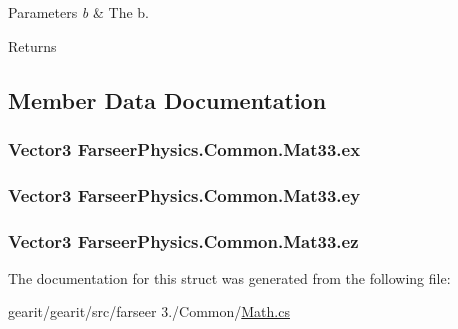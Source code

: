 \begin{DoxyParams}{Parameters}
{\em b} & The b.\\
\hline
\end{DoxyParams}
\begin{DoxyReturn}{Returns}

\end{DoxyReturn}


\subsection{Member Data Documentation}
\hypertarget{struct_farseer_physics_1_1_common_1_1_mat33_ae26309da39f12901e1ad482de69716fa}{
\subsubsection[{ex}]{\setlength{\rightskip}{0pt plus 5cm}Vector3 Farseer\+Physics.\+Common.\+Mat33.\+ex}}\label{struct_farseer_physics_1_1_common_1_1_mat33_ae26309da39f12901e1ad482de69716fa}
\hypertarget{struct_farseer_physics_1_1_common_1_1_mat33_aa9a11f37f4560ffeab5c101d3a6d2367}{
\subsubsection[{ey}]{\setlength{\rightskip}{0pt plus 5cm}Vector3 Farseer\+Physics.\+Common.\+Mat33.\+ey}}\label{struct_farseer_physics_1_1_common_1_1_mat33_aa9a11f37f4560ffeab5c101d3a6d2367}
\hypertarget{struct_farseer_physics_1_1_common_1_1_mat33_a2a90b6097670a3db5c53c2e41aeae20c}{
\subsubsection[{ez}]{\setlength{\rightskip}{0pt plus 5cm}Vector3 Farseer\+Physics.\+Common.\+Mat33.\+ez}}\label{struct_farseer_physics_1_1_common_1_1_mat33_a2a90b6097670a3db5c53c2e41aeae20c}


The documentation for this struct was generated from the following file\+:\begin{DoxyCompactItemize}
\item 
gearit/gearit/src/farseer 3./\+Common/\hyperlink{_math_8cs}{Math.\+cs}\end{DoxyCompactItemize}
